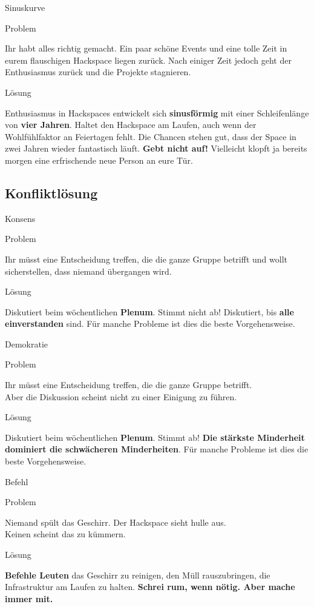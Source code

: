 \documentclass[aspectratio=43]{beamer}
\newcommand{\pattern}[2]{
  \begin{alertblock}{Problem}
    #1
  \end{alertblock}
  \pause
  \begin{exampleblock}{Lösung}
    #2
  \end{exampleblock}
}
\begin{document}
  \begin{frame}{Sinuskurve}
    \pattern{
      Ihr habt alles richtig gemacht. Ein paar schöne Events und eine tolle
      Zeit in eurem flauschigen Hackspace liegen zurück. Nach einiger Zeit
      jedoch geht der Enthusiasmus zurück und die Projekte stagnieren.
    }{
      Enthusiasmus in Hackspaces entwickelt sich \textbf{sinusförmig} mit einer
      Schleifenlänge von \textbf{vier Jahren}. Haltet den Hackspace am Laufen,
      auch wenn der Wohlfühlfaktor an Feiertagen fehlt. Die Chancen stehen gut,
      dass der Space in zwei Jahren wieder fantastisch läuft. \textbf{Gebt nicht
      auf!} Vielleicht klopft ja bereits morgen eine erfrischende neue Person
      an eure Tür.
    }
  \end{frame}

  \subsection{Konfliktlösung}

  \begin{frame}{Konsens}
    \pattern{
      Ihr müsst eine Entscheidung treffen, die die ganze Gruppe betrifft und
      wollt sicherstellen, dass niemand übergangen wird.
    }{
      Diskutiert beim wöchentlichen \textbf{Plenum}. Stimmt nicht ab!
      Diskutiert, bis \textbf{alle einverstanden} sind. Für manche Probleme ist
      dies die beste Vorgehensweise.
    }
  \end{frame}

  \begin{frame}{Demokratie}
    \pattern{
      Ihr müsst eine Entscheidung treffen, die die ganze Gruppe betrifft.\\
      Aber die Diskussion scheint nicht zu einer Einigung zu führen.
    }{
      Diskutiert beim wöchentlichen \textbf{Plenum}. Stimmt ab!
      \textbf{Die stärkste Minderheit dominiert die schwächeren Minderheiten}.
      Für manche Probleme ist dies die beste Vorgehensweise.
    }
  \end{frame}

  \begin{frame}{Befehl}
    \pattern{
      Niemand spült das Geschirr. Der Hackspace sieht hulle aus.\\
      Keinen scheint das zu kümmern.
    }{
      \textbf{Befehle Leuten} das Geschirr zu reinigen, den Müll rauszubringen,
      die Infrastruktur am Laufen zu halten. \textbf{Schrei rum, wenn nötig.
      Aber mache immer mit.}
    }
  \end{frame}
\end{document}
